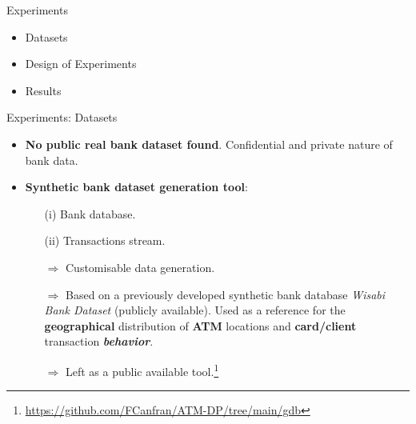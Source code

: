 
\begin{frame}{Experiments}
    \begin{itemize}
        \item Datasets
        \vspace{1em}
        \item Design of Experiments
        \vspace{1em}
        \item Results
    \end{itemize}
\end{frame}


\begin{frame}{Experiments: Datasets}
\begin{itemize}
    \item \textbf{No public real bank dataset found}. Confidential and private nature of bank data.
    \vspace{1em}
    \item \textbf{Synthetic bank dataset generation tool}: 
    \begin{itemize}
        \item[(i)] Bank database.
        \vspace{0.5em}
        \item[(ii)] Transactions stream.
    \end{itemize}
    \vspace{1em}
    \begin{itemize}
        \item[$\Rightarrow$] Customisable data generation.
        \vspace{0.5em}
        \item[$\Rightarrow$] Based on a previously developed synthetic bank database \emph{Wisabi Bank Dataset} (publicly available). Used as a reference for the \textbf{geographical} distribution of \textbf{ATM} locations and \textbf{card/client} transaction \textbf{\emph{behavior}}.
        \vspace{0.5em}
        \item[$\Rightarrow$] Left as a public available tool.\footnote{\url{https://github.com/FCanfran/ATM-DP/tree/main/gdb}}
    \end{itemize}    
\end{itemize}
\end{frame}

